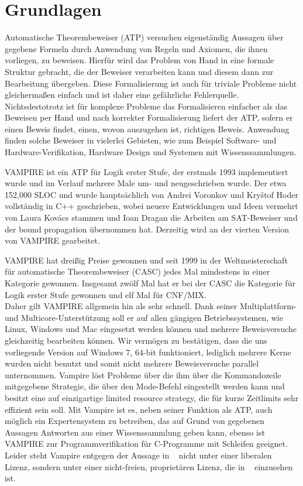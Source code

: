 \documentclass{acm_proc_article-sp-german}
\begin{document}
\section{Grundlagen}
\label{sec:foundations}
Automatische Theorembeweiser (ATP) versuchen eigenständig Aussagen über gegebene Formeln durch Anwendung von Regeln und Axiomen, die ihnen vorliegen, zu beweisen.
Hierfür wird das Problem von Hand in eine formale Struktur gebracht, die der Beweiser verarbeiten kann und diesem dann zur Bearbeitung übergeben.
Diese Formalisierung ist auch für triviale Probleme nicht gleichermaßen einfach und ist daher eine gefährliche Fehlerquelle. 
Nichtsdestotrotz ist für komplexe Probleme das Formalisieren einfacher als das Beweisen per Hand und nach korrekter Formalisierung liefert der ATP, 
sofern er einen Beweis findet, einen, wovon auszugehen ist, richtigen Beweis. 
Anwendung finden solche Beweiser in vielerlei Gebieten, wie zum Beispiel Software- und Hardware-Verifikation, Hardware Design und Systemen mit Wissenssammlungen.

VAMPIRE ist ein ATP für Logik erster Stufe, der erstmals 1993 implementiert wurde und im Verlauf mehrere Male um- und neugeschrieben wurde.
Der etwa 152,000 SLOC und wurde hauptsächlich von Andrei Voronkov und Kry{\v{s}}tof Hoder vollständig in C++ geschrieben, 
wobei neuere Entwicklungen und Ideen vermehrt von Laura Kov{\'a}cs stammen und Ioan Dragan die Arbeiten am SAT-Beweiser und der bound propagation übernommen hat.
Derzeitig wird an der vierten Version von VAMPIRE gearbeitet.

VAMPIRE hat dreißig Preise gewonnen und seit 1999 in der Weltmeisterschaft für automatische Theorembeweiser (CASC) jedes Mal mindestens in einer Kategorie gewonnen.
Insgesamt zwölf Mal hat er bei der CASC die Kategorie für Logik erster Stufe gewonnen und elf Mal für CNF/MIX. ~\cite{vampirehp} \\ Daher gilt VAMPIRE allgemein hin als sehr schnell.
Dank seiner Multiplattform- und Multicore-Unterstützung soll er auf allen gängigen Betriebssystemen, wie Linux, Windows und Mac eingesetzt werden können und mehrere Beweisversuche gleichzeitig bearbeiten können.
Wir vermögen zu bestätigen, dass die uns vorliegende Version auf Windows 7, 64-bit funktioniert, lediglich mehrere Kerne wurden nicht benutzt und somit nicht mehrere Beweisversuche parallel unternommen.
Vampire löst Probleme über die ihm über die Kommandozeile mitgegebene Strategie, die über den Mode-Befehl eingestellt werden kann und besitzt eine auf einzigartige limited resource strategy, die für kurze Zeitlimits sehr effizient sein soll. Mit Vampire ist es, neben seiner Funktion als ATP, auch möglich ein Expertensystem zu betreiben, das auf Grund von gegebenen Aussagen Antworten aus einer Wissenssammlung geben kann, ebenso ist VAMPIRE zur Programmverifikation für C-Programme mit Schleifen geeignet. 
Leider steht Vampire entgegen der Aussage in ~\cite{cav2013} nicht unter einer liberalen Lizenz, sondern unter einer nicht-freien, proprietären Lizenz, die in ~\cite{vampirehp} einzusehen ist.
\end{document}
